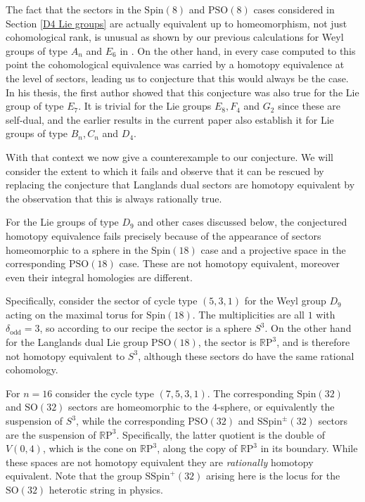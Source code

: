 \documentclass[11pt,a4paper]{article}
\def\SSpin{\mathrm{SSpin}}
\def\Spin{\mathrm{Spin}}
\def\SO{\mathrm{SO}}
\def\PSO{\mathrm{PSO}}
\def\SSpin{\mathrm{SSpin}}
\def\R{\mathbb{R}}
\def\RP{\R\mathrm{P}}
\def\odd{\mathrm{odd}}
\begin{document}
The fact that the sectors in the $\Spin(8)$ and $\PSO(8)$ cases considered in Section \ref{D4 Lie groups} are actually equivalent up to homeomorphism, not just cohomological rank, is unusual as shown by our previous calculations for Weyl groups of type $A_n$ and $E_6$ in \cite{NPWAn, NPWE6}. On the other hand, in every case computed to this point the cohomological equivalence was carried by a homotopy equivalence at the level of sectors, leading us to conjecture that this would always be the case. In his thesis, \cite{Majda} the first author showed that this conjecture was also true for the Lie group of type $E_7$. It is trivial for the Lie groups $E_8, F_4$ and $G_2$ since these are self-dual, and the earlier results in the current paper also establish it for Lie groups of type $B_n, C_n$ and $D_4$. 

With that context we now give a counterexample to our conjecture. We will consider the extent to which it fails and observe that it can be rescued by replacing the conjecture that Langlands dual sectors are homotopy equivalent by the observation that this is always rationally true. 

For the Lie groups of type $D_9$ and  other cases discussed below, the conjectured homotopy equivalence fails precisely because of the appearance of sectors homeomorphic to a sphere in the $\Spin(18)$ case and a projective space in the corresponding $\PSO(18)$ case. These are not homotopy equivalent, moreover even their integral homologies are different. 


Specifically, consider the sector of cycle type $(5,3,1)$ for the Weyl group $D_9$ acting on the maximal torus for $\Spin(18)$. The multiplicities are all $1$ with $\delta_{\odd} = 3$, so according to our recipe the sector is a sphere $S^3$. On the other hand for the Langlands dual Lie group $\PSO(18)$, the sector is $\RP^3$, and is therefore not homotopy equivalent to $S^3$, although these sectors do have the same rational cohomology.

\medskip

For $n=16$ consider the cycle type $(7,5,3,1)$. The corresponding $\Spin(32)$ and $\SO(32)$ sectors are homeomorphic to the $4$-sphere, or equivalently the suspension of $S^3$, while the corresponding $\PSO(32)$ and $\SSpin^\pm(32)$ sectors are the suspension of $\RP^{3}$. Specifically, the latter quotient is the double of $V(0, 4)$, which is the cone on $\RP^3$, along the copy of $\RP^3$ in its boundary. While these spaces are not homotopy equivalent they are \emph{rationally} homotopy equivalent. Note that the group $\SSpin^+(32)$ arising here is the locus for the $\SO(32)$ heterotic string in physics.
\end{document}
